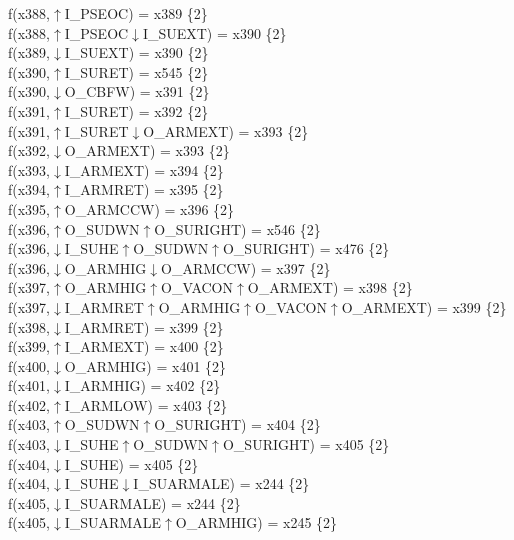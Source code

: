f(x388,$\uparrow$I\_PSEOC) = x389 \{2\} \\  
f(x388,$\uparrow$I\_PSEOC$\downarrow$I\_SUEXT) = x390 \{2\} \\  
f(x389,$\downarrow$I\_SUEXT) = x390 \{2\} \\  
f(x390,$\uparrow$I\_SURET) = x545 \{2\} \\  
f(x390,$\downarrow$O\_CBFW) = x391 \{2\} \\  
f(x391,$\uparrow$I\_SURET) = x392 \{2\} \\  
f(x391,$\uparrow$I\_SURET$\downarrow$O\_ARMEXT) = x393 \{2\} \\  
f(x392,$\downarrow$O\_ARMEXT) = x393 \{2\} \\  
f(x393,$\downarrow$I\_ARMEXT) = x394 \{2\} \\  
f(x394,$\uparrow$I\_ARMRET) = x395 \{2\} \\  
f(x395,$\uparrow$O\_ARMCCW) = x396 \{2\} \\  
f(x396,$\uparrow$O\_SUDWN$\uparrow$O\_SURIGHT) = x546 \{2\} \\  
f(x396,$\downarrow$I\_SUHE$\uparrow$O\_SUDWN$\uparrow$O\_SURIGHT) = x476 \{2\} \\  
f(x396,$\downarrow$O\_ARMHIG$\downarrow$O\_ARMCCW) = x397 \{2\} \\  
f(x397,$\uparrow$O\_ARMHIG$\uparrow$O\_VACON$\uparrow$O\_ARMEXT) = x398 \{2\} \\  
f(x397,$\downarrow$I\_ARMRET$\uparrow$O\_ARMHIG$\uparrow$O\_VACON$\uparrow$O\_ARMEXT) = x399 \{2\} \\  
f(x398,$\downarrow$I\_ARMRET) = x399 \{2\} \\  
f(x399,$\uparrow$I\_ARMEXT) = x400 \{2\} \\  
f(x400,$\downarrow$O\_ARMHIG) = x401 \{2\} \\  
f(x401,$\downarrow$I\_ARMHIG) = x402 \{2\} \\  
f(x402,$\uparrow$I\_ARMLOW) = x403 \{2\} \\  
f(x403,$\uparrow$O\_SUDWN$\uparrow$O\_SURIGHT) = x404 \{2\} \\  
f(x403,$\downarrow$I\_SUHE$\uparrow$O\_SUDWN$\uparrow$O\_SURIGHT) = x405 \{2\} \\  
f(x404,$\downarrow$I\_SUHE) = x405 \{2\} \\  
f(x404,$\downarrow$I\_SUHE$\downarrow$I\_SUARMALE) = x244 \{2\} \\  
f(x405,$\downarrow$I\_SUARMALE) = x244 \{2\} \\  
f(x405,$\downarrow$I\_SUARMALE$\uparrow$O\_ARMHIG) = x245 \{2\} \\  
